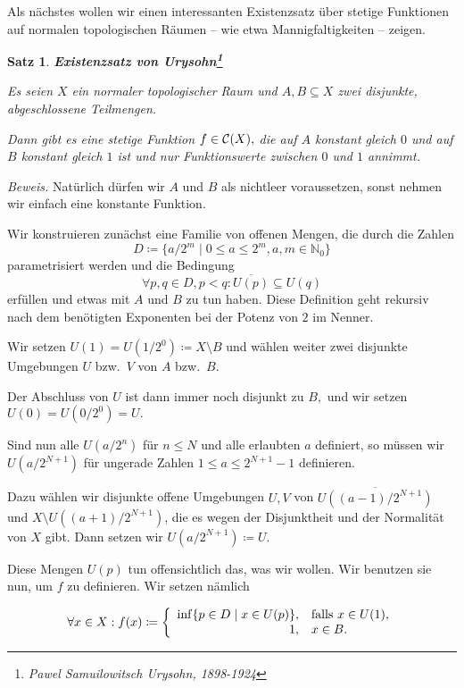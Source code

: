 \documentclass[12pt]{scrbook}   %
\newtheorem{satzX}[alles]{Satz}
\newenvironment{satz}[1]{\begin{satzX}{\bf #1}\nopagebreak\par}{\end{satzX}}
\newcommand{\da}{\coloneqq}
\begin{document}
Als n\"achstes wollen wir einen interessanten Existenzsatz \"uber stetige
Funktionen auf normalen topologischen R\"aumen -- wie etwa Mannigfaltigkeiten 
-- zeigen. 

\begin{satz}{Existenzsatz von Urysohn\footnote{Pawel Samuilowitsch Urysohn, 1898-1924}}
Es seien $X$ ein normaler topologischer Raum und $A,B\subseteq X$ zwei 
disjunkte, abgeschlossene Teilmengen. 

Dann gibt es eine stetige Funktion $f\in{\cal C}(X),$ die auf $A$ konstant 
gleich $0$ und auf $B$ konstant gleich $1$ ist und nur Funktionswerte zwischen 
$0$ und $1$ annimmt.
\end{satz}


{\it Beweis.} Nat\"urlich d\"urfen wir $A$ und $B$ als nichtleer voraussetzen, 
sonst nehmen wir einfach eine konstante Funktion.

Wir konstruieren zun\"achst eine Familie von offenen Mengen, die durch die
Zahlen 
$$D\da\{a/2^m \mid 0\leq a\leq 2^m, a,m\in \mathbb N_0\}$$ 
parametrisiert werden und die Bedingung
$$\forall p,q\in D, p<q: \overline{U(p)} \subseteq U(q) $$
erf\"ullen und etwas mit $A$ und $B$ zu tun haben. Diese Definition geht
rekursiv nach dem ben\"otigten Exponenten bei der Potenz von $2$ im Nenner.

Wir setzen $U(1) = U(1/2^0) \da X\setminus B$ und
w\"ahlen weiter zwei disjunkte Umgebungen $U$ bzw.\ $V$ von $A$ bzw.\  $B.$

Der Abschluss von $U$ ist dann immer noch disjunkt zu $B,$ und wir setzen 
$U(0)=U(0/2^0) = U.$

Sind nun alle $U(a/2^n)$ f\"ur $n\leq N$ und alle erlaubten $a$ definiert, so 
m\"ussen wir $U(a/2^{N+1})$ f\"ur ungerade Zahlen $1\leq a\leq 2^{N+1}-1$ 
definieren.

Dazu w\"ahlen wir disjunkte offene Umgebungen $U,V$ von 
$\overline{U((a-1)/2^{N+1})}$ und $X\setminus U((a+1)/2^{N+1})$, die es 
wegen der Disjunktheit und der Normalit\"at von $X$ gibt.
Dann setzen wir $U(a/2^{N+1}) \da U.$

Diese Mengen $U(p)$ tun offensichtlich das, was wir wollen. Wir benutzen sie
nun, um $f$ zu definieren. Wir setzen n\"amlich

$$\forall x\in X: f(x)\da\left\{\begin{array}{rl}
\inf\{p\in D \mid x\in U(p)\}, & {\rm falls}\ x\in U(1),\\
1                            , & x\in B.\\
\end{array}\right.$$
\end{document}
